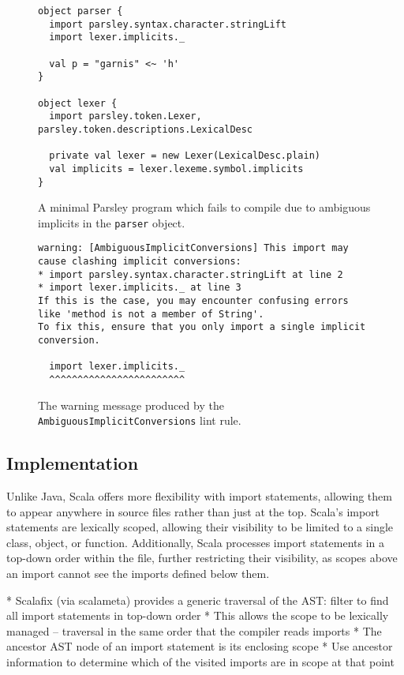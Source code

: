 \documentclass[../../main.tex]{subfiles}
\begin{document}
\begin{figure}[htbp]
\begin{verbatim}
object parser {
  import parsley.syntax.character.stringLift
  import lexer.implicits._

  val p = "garnis" <~ 'h'
}

object lexer {
  import parsley.token.Lexer, parsley.token.descriptions.LexicalDesc

  private val lexer = new Lexer(LexicalDesc.plain)
  val implicits = lexer.lexeme.symbol.implicits
}
\end{verbatim}
\caption{A minimal Parsley program which fails to compile due to ambiguous implicits in the \texttt{parser} object.}
\label{fig:ambiguous-implicits-example}
\end{figure}

\begin{figure}[htbp]
\begin{verbatim}
warning: [AmbiguousImplicitConversions] This import may cause clashing implicit conversions:
* import parsley.syntax.character.stringLift at line 2
* import lexer.implicits._ at line 3
If this is the case, you may encounter confusing errors like 'method is not a member of String'.
To fix this, ensure that you only import a single implicit conversion.

  import lexer.implicits._
  ^^^^^^^^^^^^^^^^^^^^^^^^  
\end{verbatim}
\caption{The warning message produced by the \texttt{AmbiguousImplicitConversions} lint rule.}
\label{fig:ambiguous-implicits-warning}
\end{figure}

\subsection*{Implementation}
Unlike Java, Scala offers more flexibility with import statements, allowing them to appear anywhere in source files rather than just at the top.
Scala's import statements are lexically scoped, allowing their visibility to be limited to a single class, object, or function.
Additionally, Scala processes import statements in a top-down order within the file, further restricting their visibility, as scopes above an import cannot see the imports defined below them.


* Scalafix (via scalameta) provides a generic traversal of the AST: filter to find all import statements in top-down order
* This allows the scope to be lexically managed -- traversal in the same order that the compiler reads imports
* The ancestor AST node of an import statement is its enclosing scope
* Use ancestor information to determine which of the visited imports are in scope at that point
\end{document}
